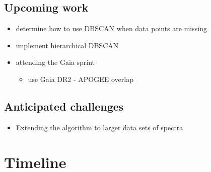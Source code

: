 \documentclass[11pt]{article}
\begin{document}
    
    \subsection*{Upcoming work} 
    \begin{itemize}
    \item determine how to use DBSCAN when data points are missing
    \item implement hierarchical DBSCAN
    \item attending the Gaia sprint
   		\begin{itemize}
   		\item use Gaia DR2 - APOGEE overlap
   		\end{itemize}
    \end{itemize}
    
    \subsection*{Anticipated challenges}
    \begin{itemize}
    	\item Extending the algorithm to larger data sets of spectra
    \end{itemize}

    

\section*{Timeline}
\end{document}
